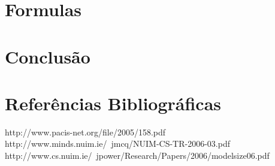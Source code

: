 \documentclass[11pt,a4paper,notitlepage]{article}
\begin{document}
\section{Formulas}


\section{Conclusão}

\section{Referências Bibliográficas}
http://www.pacis-net.org/file/2005/158.pdf
http://www.minds.nuim.ie/~jmcq/NUIM-CS-TR-2006-03.pdf
http://www.cs.nuim.ie/~jpower/Research/Papers/2006/modelsize06.pdf
\end{document}
